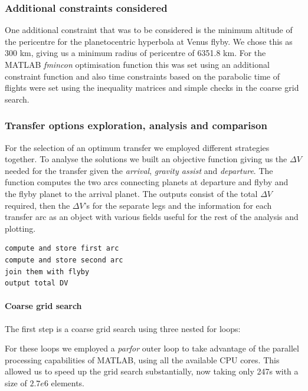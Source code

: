 \documentclass[11pt,a4paper]{report}
\begin{document}
\subsubsection{Additional constraints considered}
One additional constraint that was to be considered is the minimum altitude of the pericentre for the planetocentric hyperbola at Venus flyby. We chose this as 300 km, giving us a minimum radius of pericentre of 6351.8 km. For the MATLAB \textit{fmincon} optimisation function this was set using an additional constraint function and also time constraints based on the parabolic time of flights were set using the inequality matrices and simple checks in the coarse grid search.

\subsubsection{Transfer options exploration, analysis and comparison}
For the selection of an optimum transfer we employed different strategies together.
To analyse the solutions we built an objective function giving us the $\Delta V$ needed for the transfer given the \emph{arrival}, \emph{gravity assist} and \emph{departure}. The function computes the two arcs connecting planets at departure and flyby and the flyby planet to the arrival planet. The outputs consist of the total $\Delta V$ required, then the $\Delta V$'s for the separate legs and the information for each transfer arc as an object with various fields useful for the rest of the analysis and plotting.

\lstset{style=mystyle}
\begin{lstlisting}[frame=single,caption=GAtransfer objective function structure]  
compute and store first arc
compute and store second arc
join them with flyby
output total DV 
\end{lstlisting}

\paragraph{Coarse grid search}
The first step is a coarse grid search using three nested for loops:\\

\lstset{style=mystyle}


For these loops we employed a \textit{parfor} outer loop to take advantage of the parallel processing capabilities of MATLAB, using all the available CPU cores. This allowed us to speed up the grid search substantially, now taking only 247s with a size of $2.7e6  $ elements.
\end{document}

